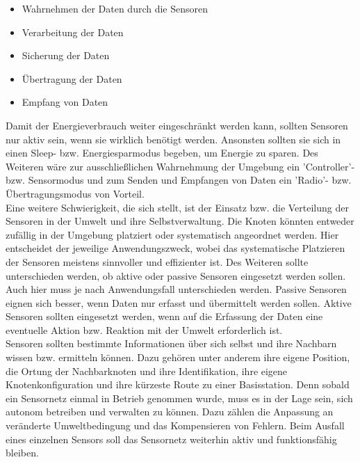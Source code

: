 \begin{itemize}
	\item Wahrnehmen der Daten durch die Sensoren
	\item Verarbeitung der Daten
	\item Sicherung der Daten
	\item Übertragung der Daten
	\item Empfang von Daten
\end{itemize} 
\newpage
Damit der Energieverbrauch weiter eingeschränkt werden kann, sollten Sensoren nur aktiv sein, wenn sie wirklich benötigt werden. Ansonsten sollten sie sich in einen Sleep- bzw. Energiesparmodus begeben, um Energie zu sparen. Des Weiteren wäre zur ausschließlichen Wahrnehmung der Umgebung ein 'Controller'- bzw. Sensormodus und zum Senden und Empfangen von Daten ein 'Radio'- bzw. Übertragungsmodus von Vorteil.\\

Eine weitere Schwierigkeit, die sich stellt, ist der Einsatz bzw. die Verteilung der Sensoren in der Umwelt und ihre Selbstverwaltung. Die Knoten könnten entweder zufällig in der Umgebung platziert oder systematisch angeordnet werden. Hier entscheidet der jeweilige Anwendungszweck, wobei das systematische Platzieren der Sensoren meistens sinnvoller und effizienter ist.
Des Weiteren sollte unterschieden werden, ob aktive oder passive Sensoren eingesetzt werden sollen. Auch hier muss je nach Anwendungsfall unterschieden werden. Passive Sensoren eignen sich besser, wenn Daten nur erfasst und übermittelt werden sollen. Aktive Sensoren sollten eingesetzt werden, wenn auf die Erfassung der Daten eine eventuelle Aktion bzw. Reaktion mit der Umwelt erforderlich ist.\\ 

Sensoren sollten bestimmte Informationen über sich selbst und ihre Nachbarn wissen bzw. ermitteln können. Dazu gehören unter anderem ihre eigene Position, die Ortung der Nachbarknoten und ihre Identifikation, ihre eigene Knotenkonfiguration und ihre kürzeste Route zu einer Basisstation. Denn sobald ein Sensornetz einmal in Betrieb genommen wurde, muss es in der Lage sein, sich autonom betreiben und verwalten zu können. Dazu zählen die Anpassung an veränderte Umweltbedingung und das Kompensieren von Fehlern. Beim Ausfall eines einzelnen Sensors soll das Sensornetz weiterhin aktiv und funktionsfähig bleiben.\\

